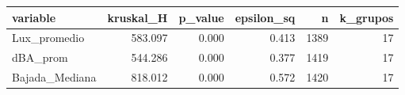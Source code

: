 \begin{tabular}{lrrrrr}
\toprule
variable & kruskal\_H & p\_value & epsilon\_sq & n & k\_grupos \\
\midrule
Lux\_promedio & 583.097 & 0.000 & 0.413 & 1389 & 17 \\
dBA\_prom & 544.286 & 0.000 & 0.377 & 1419 & 17 \\
Bajada\_Mediana & 818.012 & 0.000 & 0.572 & 1420 & 17 \\
\bottomrule
\end{tabular}
